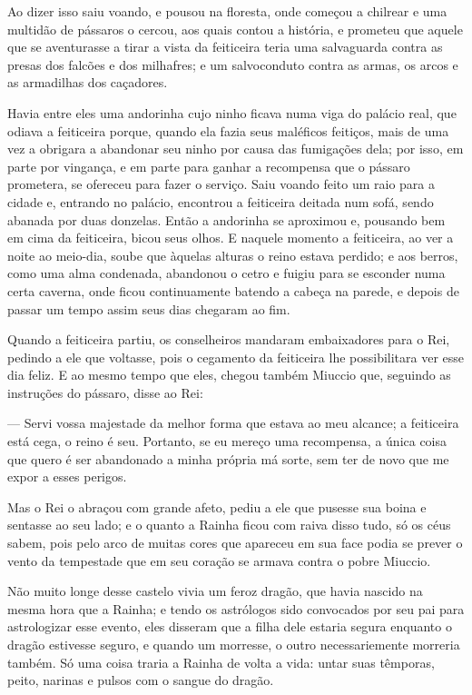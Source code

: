 Ao dizer isso saiu voando, e pousou na floresta, onde começou a
chilrear e uma multidão de pássaros o cercou, aos quais contou a
história, e prometeu que aquele que se aventurasse a tirar a vista da
feiticeira teria uma salvaguarda contra as presas dos falcões e dos
milhafres; e um salvoconduto contra as armas, os arcos e as
armadilhas dos caçadores.

Havia entre eles uma andorinha cujo ninho ficava numa viga do palácio
real, que odiava a feiticeira porque, quando ela fazia seus maléficos
feitiços, mais de uma vez a obrigara a abandonar seu ninho por causa
das fumigações dela; por isso, em parte por vingança, e em parte para
ganhar a recompensa que o pássaro prometera, se ofereceu para fazer o
serviço. Saiu voando feito um raio para a cidade e, entrando no
palácio, encontrou a feiticeira deitada num sofá, sendo abanada por
duas donzelas. Então a andorinha se aproximou e, pousando bem em cima
da feiticeira, bicou seus olhos. E naquele momento a feiticeira, ao
ver a noite ao meio-dia, soube que àquelas alturas o reino estava
perdido; e aos berros, como uma alma condenada, abandonou o cetro e
fuigiu para se esconder numa certa caverna, onde ficou continuamente
batendo a cabeça na parede, e depois de passar um tempo assim seus
dias chegaram ao fim.

Quando a feiticeira partiu, os conselheiros mandaram embaixadores para
o Rei, pedindo a ele que voltasse, pois o cegamento da feiticeira lhe
possibilitara ver esse dia feliz. E ao mesmo tempo que eles, chegou
também Miuccio que, seguindo as instruções do pássaro, disse ao Rei:

— Servi vossa majestade da melhor forma que estava ao meu alcance; a
feiticeira está cega, o reino é seu. Portanto, se eu mereço uma
recompensa, a única coisa que quero é ser abandonado a minha própria
má sorte, sem ter de novo que me expor a esses perigos.

Mas o Rei o abraçou com grande afeto, pediu a ele que pusesse sua
boina e sentasse ao seu lado; e o quanto a Rainha ficou com raiva
disso tudo, só os céus sabem, pois pelo arco de muitas cores que
apareceu em sua face podia se prever o vento da tempestade que em seu
coração se armava contra o pobre Miuccio.

Não muito longe desse castelo vivia um feroz dragão, que havia nascido
na mesma hora que a Rainha; e tendo os astrólogos sido convocados por
seu pai para astrologizar esse evento, eles disseram que a filha dele
estaria segura enquanto o dragão estivesse seguro, e quando um
morresse, o outro necessariemente morreria também. Só uma coisa
traria a Rainha de volta a vida: untar suas têmporas, peito, narinas
e pulsos com o sangue do dragão.

